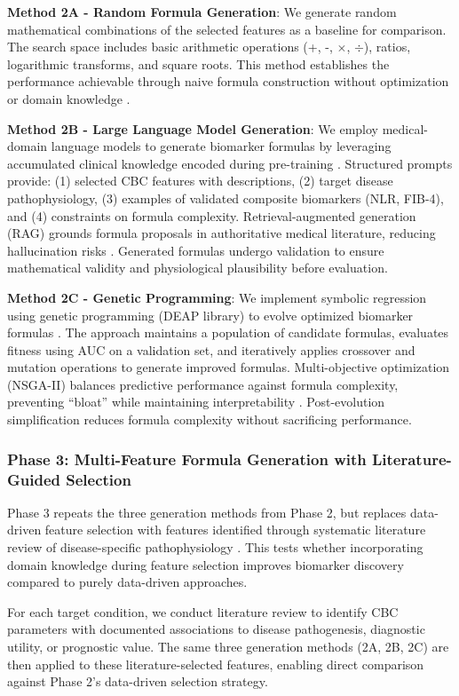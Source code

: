 \documentclass[12pt,a4paper]{article}
\begin{document}
\textbf{Method 2A - Random Formula Generation}: We generate random mathematical combinations of the selected features as a baseline for comparison. The search space includes basic arithmetic operations (+, -, $\times$, $\div$), ratios, logarithmic transforms, and square roots. This method establishes the performance achievable through naive formula construction without optimization or domain knowledge \cite{ref12}.

\textbf{Method 2B - Large Language Model Generation}: We employ medical-domain language models to generate biomarker formulas by leveraging accumulated clinical knowledge encoded during pre-training \cite{ref17,ref21}. Structured prompts provide: (1) selected CBC features with descriptions, (2) target disease pathophysiology, (3) examples of validated composite biomarkers (NLR, FIB-4), and (4) constraints on formula complexity. Retrieval-augmented generation (RAG) grounds formula proposals in authoritative medical literature, reducing hallucination risks \cite{ref18}. Generated formulas undergo validation to ensure mathematical validity and physiological plausibility before evaluation.

\textbf{Method 2C - Genetic Programming}: We implement symbolic regression using genetic programming (DEAP library) to evolve optimized biomarker formulas \cite{ref12,ref13}. The approach maintains a population of candidate formulas, evaluates fitness using AUC on a validation set, and iteratively applies crossover and mutation operations to generate improved formulas. Multi-objective optimization (NSGA-II) balances predictive performance against formula complexity, preventing ``bloat'' while maintaining interpretability \cite{ref12}. Post-evolution simplification reduces formula complexity without sacrificing performance.

\subsubsection{Phase 3: Multi-Feature Formula Generation with Literature-Guided Selection}

Phase 3 repeats the three generation methods from Phase 2, but replaces data-driven feature selection with features identified through systematic literature review of disease-specific pathophysiology \cite{ref14,ref15,ref16,ref25}. This tests whether incorporating domain knowledge during feature selection improves biomarker discovery compared to purely data-driven approaches.

For each target condition, we conduct literature review to identify CBC parameters with documented associations to disease pathogenesis, diagnostic utility, or prognostic value. The same three generation methods (2A, 2B, 2C) are then applied to these literature-selected features, enabling direct comparison against Phase 2's data-driven selection strategy.
\end{document}
